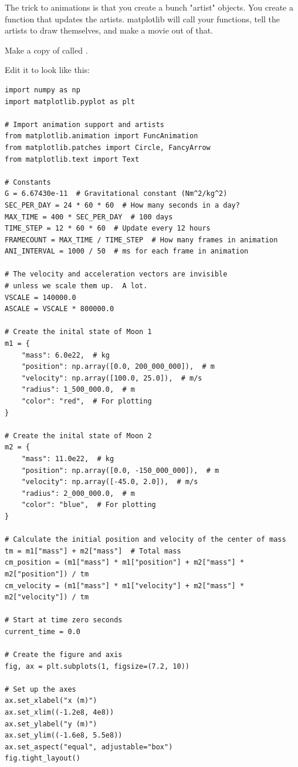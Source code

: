 The trick to animations is that you create a bunch "artist" objects.  You create a function that updates the 
artists. matplotlib will call your functions,  tell the artists to draw themselves,  and make a movie out of that.

Make a copy of  called . 

Edit it to look like this:
\begin{verbatim}
import numpy as np
import matplotlib.pyplot as plt

# Import animation support and artists
from matplotlib.animation import FuncAnimation
from matplotlib.patches import Circle, FancyArrow
from matplotlib.text import Text

# Constants
G = 6.67430e-11  # Gravitational constant (Nm^2/kg^2)
SEC_PER_DAY = 24 * 60 * 60  # How many seconds in a day?
MAX_TIME = 400 * SEC_PER_DAY  # 100 days
TIME_STEP = 12 * 60 * 60  # Update every 12 hours
FRAMECOUNT = MAX_TIME / TIME_STEP  # How many frames in animation
ANI_INTERVAL = 1000 / 50  # ms for each frame in animation

# The velocity and acceleration vectors are invisible
# unless we scale them up.  A lot.
VSCALE = 140000.0
ASCALE = VSCALE * 800000.0

# Create the inital state of Moon 1
m1 = {
    "mass": 6.0e22,  # kg
    "position": np.array([0.0, 200_000_000]),  # m
    "velocity": np.array([100.0, 25.0]),  # m/s
    "radius": 1_500_000.0,  # m
    "color": "red",  # For plotting
}

# Create the inital state of Moon 2
m2 = {
    "mass": 11.0e22,  # kg
    "position": np.array([0.0, -150_000_000]),  # m
    "velocity": np.array([-45.0, 2.0]),  # m/s
    "radius": 2_000_000.0,  # m
    "color": "blue",  # For plotting
}

# Calculate the initial position and velocity of the center of mass
tm = m1["mass"] + m2["mass"]  # Total mass
cm_position = (m1["mass"] * m1["position"] + m2["mass"] * m2["position"]) / tm
cm_velocity = (m1["mass"] * m1["velocity"] + m2["mass"] * m2["velocity"]) / tm

# Start at time zero seconds
current_time = 0.0

# Create the figure and axis
fig, ax = plt.subplots(1, figsize=(7.2, 10))

# Set up the axes
ax.set_xlabel("x (m)")
ax.set_xlim((-1.2e8, 4e8))
ax.set_ylabel("y (m)")
ax.set_ylim((-1.6e8, 5.5e8))
ax.set_aspect("equal", adjustable="box")
fig.tight_layout()


\end{verbatim}
